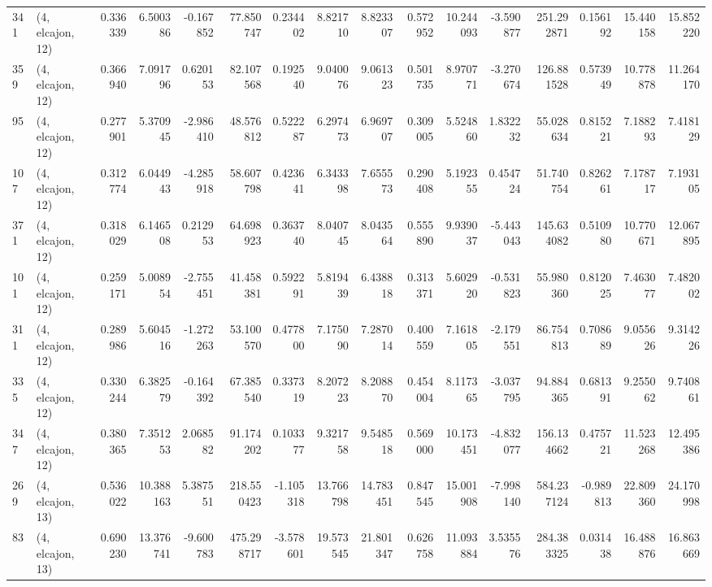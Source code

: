 \begin{tabular}{llrrrrrrrrrrrrrr}
341 &  (4, elcajon, 12) &   0.336339 &   6.500386 &  -0.167852 &    77.850747 &   0.234402 &   8.821710 &   8.823307 &  0.572952 &  10.244093 &  -3.590877 &   251.292871 &   0.156192 &  15.440158 &  15.852220 \\
359 &  (4, elcajon, 12) &   0.366940 &   7.091796 &   0.620153 &    82.107568 &   0.192540 &   9.040076 &   9.061323 &  0.501735 &   8.970771 &  -3.270674 &   126.881528 &   0.573949 &  10.778878 &  11.264170 \\
95  &  (4, elcajon, 12) &   0.277901 &   5.370945 &  -2.986410 &    48.576812 &   0.522287 &   6.297473 &   6.969707 &  0.309005 &   5.524860 &   1.832232 &    55.028634 &   0.815221 &   7.188293 &   7.418129 \\
107 &  (4, elcajon, 12) &   0.312774 &   6.044943 &  -4.285918 &    58.607798 &   0.423641 &   6.343398 &   7.655573 &  0.290408 &   5.192355 &   0.454724 &    51.740754 &   0.826261 &   7.178717 &   7.193105 \\
371 &  (4, elcajon, 12) &   0.318029 &   6.146508 &   0.212953 &    64.698923 &   0.363740 &   8.040745 &   8.043564 &  0.555890 &   9.939037 &  -5.443043 &   145.634082 &   0.510980 &  10.770671 &  12.067895 \\
101 &  (4, elcajon, 12) &   0.259171 &   5.008954 &  -2.755451 &    41.458381 &   0.592291 &   5.819439 &   6.438818 &  0.313371 &   5.602920 &  -0.531823 &    55.980360 &   0.812025 &   7.463077 &   7.482002 \\
311 &  (4, elcajon, 12) &   0.289986 &   5.604516 &  -1.272263 &    53.100570 &   0.477800 &   7.175090 &   7.287014 &  0.400559 &   7.161805 &  -2.179551 &    86.754813 &   0.708689 &   9.055626 &   9.314226 \\
335 &  (4, elcajon, 12) &   0.330244 &   6.382579 &  -0.164392 &    67.385540 &   0.337319 &   8.207223 &   8.208870 &  0.454004 &   8.117365 &  -3.037795 &    94.884365 &   0.681391 &   9.255062 &   9.740861 \\
347 &  (4, elcajon, 12) &   0.380365 &   7.351253 &   2.068582 &    91.174202 &   0.103377 &   9.321758 &   9.548518 &  0.569000 &  10.173451 &  -4.832077 &   156.134662 &   0.475721 &  11.523268 &  12.495386 \\
269 &  (4, elcajon, 13) &   0.536022 &  10.388163 &   5.387551 &   218.550423 &  -1.105318 &  13.766798 &  14.783451 &  0.847545 &  15.001908 &  -7.998140 &   584.237124 &  -0.989813 &  22.809360 &  24.170998 \\
83  &  (4, elcajon, 13) &   0.690230 &  13.376741 &  -9.600783 &   475.298717 &  -3.578601 &  19.573545 &  21.801347 &  0.626758 &  11.093884 &   3.535576 &   284.383325 &   0.031438 &  16.488876 &  16.863669 \\

\end{tabular}
